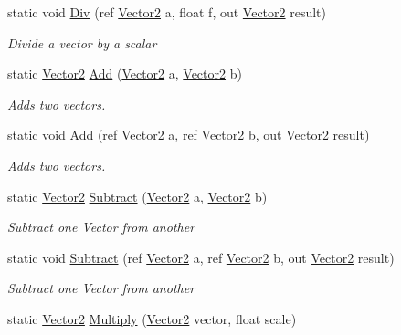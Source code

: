 \begin{DoxyCompactItemize}
static void \hyperlink{struct_open_t_k_1_1_vector2_a4555732618ad8259dcf338d59fbbbc87}{Div} (ref \hyperlink{struct_open_t_k_1_1_vector2}{Vector2} a, float f, out \hyperlink{struct_open_t_k_1_1_vector2}{Vector2} result)
\begin{DoxyCompactList}\small\item\em Divide a vector by a scalar \end{DoxyCompactList}\item 
static \hyperlink{struct_open_t_k_1_1_vector2}{Vector2} \hyperlink{struct_open_t_k_1_1_vector2_a5cc6addca4720d637e1587eb1c55fee1}{Add} (\hyperlink{struct_open_t_k_1_1_vector2}{Vector2} a, \hyperlink{struct_open_t_k_1_1_vector2}{Vector2} b)
\begin{DoxyCompactList}\small\item\em Adds two vectors. \end{DoxyCompactList}\item 
static void \hyperlink{struct_open_t_k_1_1_vector2_a14bd2a3bda0016ddcb678618124517a0}{Add} (ref \hyperlink{struct_open_t_k_1_1_vector2}{Vector2} a, ref \hyperlink{struct_open_t_k_1_1_vector2}{Vector2} b, out \hyperlink{struct_open_t_k_1_1_vector2}{Vector2} result)
\begin{DoxyCompactList}\small\item\em Adds two vectors. \end{DoxyCompactList}\item 
static \hyperlink{struct_open_t_k_1_1_vector2}{Vector2} \hyperlink{struct_open_t_k_1_1_vector2_a26fe241ba0b72418262cf0c1ef987288}{Subtract} (\hyperlink{struct_open_t_k_1_1_vector2}{Vector2} a, \hyperlink{struct_open_t_k_1_1_vector2}{Vector2} b)
\begin{DoxyCompactList}\small\item\em Subtract one Vector from another \end{DoxyCompactList}\item 
static void \hyperlink{struct_open_t_k_1_1_vector2_a8ef9cd3c2483da4eb5889f240c6fe349}{Subtract} (ref \hyperlink{struct_open_t_k_1_1_vector2}{Vector2} a, ref \hyperlink{struct_open_t_k_1_1_vector2}{Vector2} b, out \hyperlink{struct_open_t_k_1_1_vector2}{Vector2} result)
\begin{DoxyCompactList}\small\item\em Subtract one Vector from another \end{DoxyCompactList}\item 
static \hyperlink{struct_open_t_k_1_1_vector2}{Vector2} \hyperlink{struct_open_t_k_1_1_vector2_a19052e00b00997d4a641bfb988a2f21e}{Multiply} (\hyperlink{struct_open_t_k_1_1_vector2}{Vector2} vector, float scale)

\end{DoxyCompactItemize}
